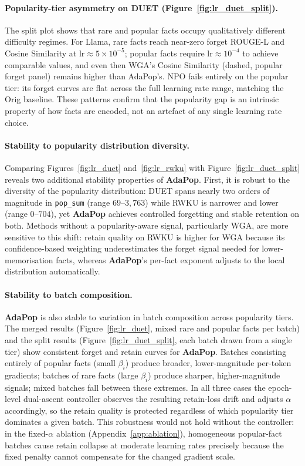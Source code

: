 \paragraph{Popularity-tier asymmetry on DUET (Figure~\ref{fig:lr_duet_split}).}
The split plot shows that rare and popular facts occupy qualitatively different difficulty regimes. For Llama, rare facts reach near-zero forget ROUGE-L and Cosine Similarity at $\text{lr} \approx 5{\times}10^{-5}$; popular facts require $\text{lr} \approx 10^{-4}$ to achieve comparable values, and even then WGA's Cosine Similarity (dashed, popular forget panel) remains higher than AdaPop's. NPO fails entirely on the popular tier: its forget curves are flat across the full learning rate range, matching the Orig baseline. These patterns confirm that the popularity gap is an intrinsic property of how facts are encoded, not an artefact of any single learning rate choice.

\paragraph{Stability to popularity distribution diversity.}
Comparing Figures~\ref{fig:lr_duet} and~\ref{fig:lr_rwku} with Figure~\ref{fig:lr_duet_split} reveals two additional stability properties of \textbf{AdaPop}. First, it is robust to the diversity of the popularity distribution: DUET spans nearly two orders of magnitude in \texttt{pop\_sum} (range $69$--$3{,}763$) while RWKU is narrower and lower (range $0$--$704$), yet \textbf{AdaPop} achieves controlled forgetting and stable retention on both. Methods without a popularity-aware signal, particularly WGA, are more sensitive to this shift: retain quality on RWKU is higher for WGA because its confidence-based weighting underestimates the forget signal needed for lower-memorisation facts, whereas \textbf{AdaPop}'s per-fact exponent adjusts to the local distribution automatically.

\paragraph{Stability to batch composition.}
\textbf{AdaPop} is also stable to variation in batch composition across popularity tiers. The merged results (Figure~\ref{fig:lr_duet}, mixed rare and popular facts per batch) and the split results (Figure~\ref{fig:lr_duet_split}, each batch drawn from a single tier) show consistent forget and retain curves for \textbf{AdaPop}. Batches consisting entirely of popular facts (small $\beta_i$) produce broader, lower-magnitude per-token gradients; batches of rare facts (large $\beta_i$) produce sharper, higher-magnitude signals; mixed batches fall between these extremes. In all three cases the epoch-level dual-ascent controller observes the resulting retain-loss drift and adjusts $\alpha$ accordingly, so the retain quality is protected regardless of which popularity tier dominates a given batch. This robustness would not hold without the controller: in the fixed-$\alpha$ ablation (Appendix~\ref{app:ablation}), homogeneous popular-fact batches cause retain collapse at moderate learning rates precisely because the fixed penalty cannot compensate for the changed gradient scale.

